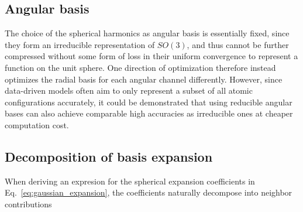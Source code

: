 \subsection{Angular basis}
The choice of the spherical harmonics as angular basis is essentially fixed, since they form an irreducible representation of $SO(3)$, and thus cannot be further compressed without some form of loss in their uniform convergence to represent a function on the unit sphere\cite{ragozin1971uniform}.
One direction of optimization therefore instead optimizes the radial basis for each angular channel differently\cite{goscinski2021optimal,bigi2022smooth}.
However, since data-driven models often aim to only represent a subset of all atomic configurations accurately, it could be demonstrated that using reducible angular bases\cite{shapeev2016moment,schutt2021equivariant,simeon2023tensornet} can also achieve comparable high accuracies as irreducible ones at cheaper computation cost\cite{zuo2020performance,xie2023ultra}.


\subsection{Decomposition of basis expansion}
When deriving an expresion for the spherical expansion coefficients in Eq.~\ref{eq:gaussian_expansion}, the coefficients naturally decompose into neighbor contributions

